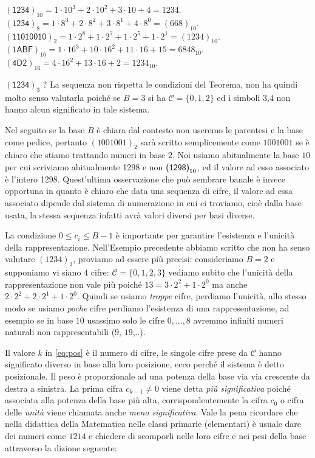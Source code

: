 \begin{ex} 
$(\textsf{1234})_{10} = 1\cdot 10^3+2\cdot 10^2 + 3 \cdot 10 + 4 =
1234$. $(\textsf{1234})_8 = 1\cdot 8^3+2\cdot 8^2+3\cdot 8^1+4\cdot 8^0 =
(668)_{10}$. $(\textsf{11010010})_2 = 1\cdot 2^8 + 1\cdot 2^7 + 1\cdot 2^5 +
1\cdot 2^1 = (1234)_{10}$. $(\textsf{1ABF})_{16} = 1\cdot 16^3 + 10\cdot 16^2 +
11 \cdot 16 + 15 = 6848_{10}$. $(\textsf{4D2})_{16} = 4\cdot 16^2 + 13\cdot 16
+ 2 = 1234_{10}$. 

\noindent $(\textsf{1234})_3$ ? La sequenza non rispetta le condizioni
del Teorema, non ha quindi molto senso valutarla poiché se $B = 3$ si ha
$\mathcal{C} = \{ 0, 1, 2 \}$ ed i simboli \textsf{3,4} non hanno alcun
significato in tale sistema. \end{ex}

Nel seguito se la base $B$ è chiara dal contesto non useremo le parentesi e la
base come pedice, pertanto $ (1001001)_2$ sarà scritto semplicemente come
$1001001$ se è chiaro che stiamo trattando numeri in base $2$. Noi usiamo
abitualmente la base $10$ per cui scriviamo abitualmente \textsf{1298} e non
$\mbox{\textsf{(1298)}}_{10}$, ed il valore ad esso associato è l'intero 1298.
Quest'ultima osservazione che può sembrare banale è invece opportuna in quanto
è chiaro che data una sequenza di cifre, il valore ad essa associato dipende
dal sistema di numerazione in cui ci troviamo, cioè dalla base usata, la stessa
sequenza infatti avrà valori diversi per basi diverse. 

La condizione $0 \leq c_i \leq
B-1$ è
importante per garantire l'esistenza e l'unicità della rappresentazione.
Nell'Esempio precedente abbiamo scritto che non ha senso valutare $(1234)_3$,
proviamo ad essere più precisi: consideriamo $B = 2$ e supponiamo vi siano $4$
cifre: $\mathcal{C} = \{ 0, 1, 2, 3 \}$ vediamo subito che l'unicità della
rappresentazione non vale più poiché $13 = 3\cdot 2^2 + 1 \cdot 2^0$ ma anche
$2\cdot 2^2 + 2\cdot 2^1 + 1\cdot 2^0$. Quindi se usiamo \emph{troppe} cifre,
perdiamo l'unicità, allo stesso modo se usiamo \emph{poche} cifre perdiamo
l'esistenza di una rappresentazione, ad esempio se in base $10$ usassimo solo
le cifre $0,\ldots,8$ avremmo infiniti numeri naturali non rappresentabili ($9$, $19$,..).

Il valore $k$ in \eqref{eq:pos} è il numero di cifre, le singole cifre prese da
$\mathcal{C}$ hanno significato diverso in base alla loro posizione, ecco
perché il sistema è detto posizionale. Il peso è proporzionale ad una potenza
della base via via crescente da destra a sinistra. La prima cifra $c_{k-1} \neq
0$ viene detta \emph{più significativa} poiché associata alla potenza della
base più alta, corrispondentemente la cifra $c_0$ o cifra delle \emph{unità}
viene chiamata anche \emph{meno significativa}. Vale la pena ricordare che nella didattica della Matematica nelle classi primarie (elementari) 
è usuale dare dei numeri come $1214$ e chiedere di scomporli nelle
loro cifre e nei pesi della base attraverso la dizione seguente:

